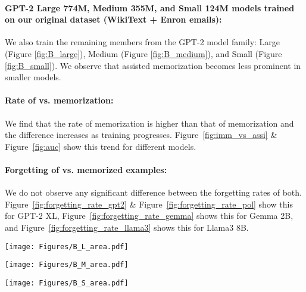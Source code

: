 \paragraph{GPT-2 Large 774M, Medium 355M, and Small 124M models trained on our original dataset (WikiText + Enron emails):} We also train the remaining members from the GPT-2 model family: Large (Figure \ref{fig:B_large}), Medium (Figure \ref{fig:B_medium}), and Small (Figure \ref{fig:B_small}). We observe that assisted memorization becomes less prominent in smaller models. 

\paragraph{Rate of \novel vs. \assisted memorization:} We find that the rate of \assisted memorization is higher than that of \novel memorization and the difference increases as training progresses. Figure~\ref{fig:imm_vs_assi} \& Figure~\ref{fig:auc} show this trend for different models. 

\paragraph{Forgetting of \novel vs. \assisted memorized examples:} We do not observe any significant difference between the forgetting rates of both. Figure~\ref{fig:forgetting_rate_gpt2} \& Figure~\ref{fig:forgetting_rate_pol} show this for GPT-2 XL, Figure~\ref{fig:forgetting_rate_gemma} shows this for Gemma 2B, and Figure~\ref{fig:forgetting_rate_llama3} shows this for Llama3 8B. 

\begin{figure*}[t]
  \texttt{[image: Figures/B\_L\_area.pdf]}  
  \caption {Different memorization categories during continuous training for GPT-2 Large trained on WikiText + Enron emails.}
  \label{fig:B_large}
\end{figure*}

 
\begin{figure*}[t]
  \texttt{[image: Figures/B\_M\_area.pdf]}  
  \caption{Different memorization categories during continuous training for GPT-2 Medium trained on WikiText + Enron emails.}
  \label{fig:B_medium}
\end{figure*}

 
\begin{figure*}[t]
  \texttt{[image: Figures/B\_S\_area.pdf]}  
  \caption {Different memorization categories during continuous training for GPT-2 Small trained on WikiText + Enron emails.}
  \label{fig:B_small}
\end{figure*}


